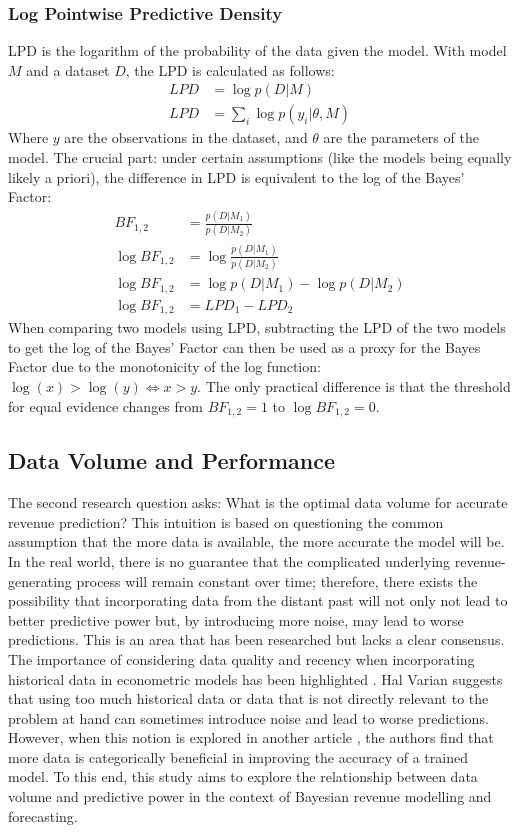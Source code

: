 \subsubsection{Log Pointwise Predictive Density}
LPD is the logarithm of the probability of the data given the model. With
model $M$ and a dataset $D$, the LPD is calculated as follows:
\begin{equation}
  \begin{split}
    LPD &= \log p(D|M) \\
    LPD &= \sum_{i} \log p(y_i|\theta, M)
  \end{split}
\end{equation}
Where $y$ are the observations in the dataset, and $\theta$ are the parameters
of the model. The crucial part: under certain assumptions (like the
models being equally likely a priori), the difference in LPD is equivalent to
the log of the Bayes' Factor:
\begin{equation}
  \begin{split}
    BF_{1,2} &= \frac{p(D|M_1)}{p(D|M_2)} \\
    \log BF_{1,2} &= \log \frac{p(D|M_1)}{p(D|M_2)} \\
    \log BF_{1,2} &= \log p(D|M_1) - \log p(D|M_2) \\
    \log BF_{1,2} &= LPD_1 - LPD_2
  \end{split}
\end{equation}
When comparing two models using LPD, subtracting the LPD of the two models to
get the log of the Bayes' Factor can then be used as a proxy for the Bayes Factor
due to the monotonicity of the log function: $\log(x) > \log(y) \iff x > y$.
The only practical difference is that the threshold for equal evidence changes from  
$BF_{1,2} = 1$ to $\log BF_{1,2} = 0$.

\subsection{Data Volume and Performance}
The second research question asks: What is the optimal data volume for accurate
revenue prediction? This intuition is based on questioning the common
assumption that the more data is available, the more accurate the model will
be. In the real world, there is no guarantee that the complicated underlying
revenue-generating process will remain constant over time; therefore, there
exists the possibility that incorporating data from the distant past will not
only not lead to better predictive power but, by introducing more noise, may
lead to worse predictions. This is an area that has been researched but lacks
a clear consensus. 
The importance of considering data quality and recency when incorporating
historical data in econometric models has been highlighted
\cite{big-data-hal-varian}. Hal Varian suggests that using too much historical
data or data that is not directly relevant to the problem at hand can sometimes
introduce noise and lead to worse predictions. However, when this notion is
explored in another article \cite{data-volume-weather}, the authors find that
more data is categorically beneficial in improving the accuracy of a trained
model. To this end, this study aims to explore the relationship between data
volume and predictive power in the context of Bayesian revenue modelling and
forecasting.
